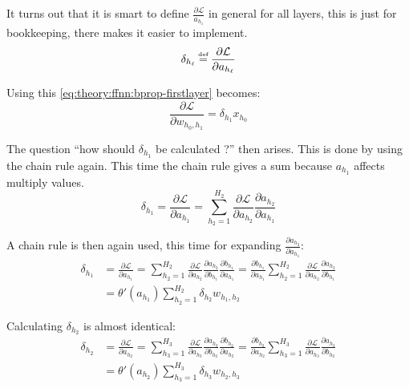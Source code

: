 It turns out that it is smart to define $\frac{\partial \mathcal{L}}{a_{h_1}}$ in general for all layers, this is just for bookkeeping, there makes it easier to implement.
\begin{equation}
\delta_{h_\ell} \defeq \frac{\partial \mathcal{L}}{\partial a_{h_\ell}}
\end{equation}

Using this \eqref{eq:theory:ffnn:bprop-firstlayer} becomes:
\begin{equation}
\frac{\partial \mathcal{L}}{\partial w_{h_0, h_1}} = \delta_{h_1} x_{h_0}
\label{eq:theory:ffnn:bprop-w01}
\end{equation}

The question ``how should $\delta_{h_1}$ be calculated ?'' then arises. This is done by using the chain rule again. This time the chain rule gives a sum because $a_{h_1}$ affects multiply values.
\begin{equation}
\delta_{h_1} = \frac{\partial \mathcal{L}}{\partial a_{h_1}} = \sum_{h_2=1}^{H_2} \frac{\partial \mathcal{L}}{\partial a_{h_2}} \frac{\partial a_{h_2}}{\partial a_{h_1}}
\end{equation}

A chain rule is then again used, this time for expanding $\frac{\partial a_{h_2}}{\partial a_{h_1}}$:
\begin{equation}
\begin{aligned}
\delta_{h_1}
&= \frac{\partial \mathcal{L}}{\partial a_{h_1}}
= \sum_{h_2=1}^{H_2} \frac{\partial \mathcal{L}}{\partial a_{h_2}} \frac{\partial a_{h_2}}{\partial b_{h_1}} \frac{\partial b_{h_1}}{\partial a_{h_1}}
= \frac{\partial b_{h_1}}{\partial a_{h_1}} \sum_{h_2=1}^{H_2} \frac{\partial \mathcal{L}}{\partial a_{h_2}} \frac{\partial a_{h_2}}{\partial b_{h_1}} \\
&= \theta'(a_{h_1}) \sum_{h_2=1}^{H_2} \delta_{h_2} w_{h_1, h_2}
\end{aligned}
\label{eq:theory:ffnn:bprop-secondlayer}
\end{equation}

Calculating $\delta_{h_2}$ is almost identical:
\begin{equation}
\begin{aligned}
\delta_{h_2}
&= \frac{\partial \mathcal{L}}{\partial a_{h_2}}
= \sum_{h_3=1}^{H_3} \frac{\partial \mathcal{L}}{\partial a_{h_3}} \frac{\partial a_{h_3}}{\partial b_{h_2}} \frac{\partial b_{h_2}}{\partial a_{h_2}}
= \frac{\partial b_{h_2}}{\partial a_{h_2}} \sum_{h_3=1}^{H_3} \frac{\partial \mathcal{L}}{\partial a_{h_3}} \frac{\partial a_{h_3}}{\partial b_{h_2}} \\
&= \theta'(a_{h_2}) \sum_{h_3=1}^{H_3} \delta_{h_3} w_{h_2, h_3}
\end{aligned}
\label{eq:theory:ffnn:bprop-thirdlayer}
\end{equation}

